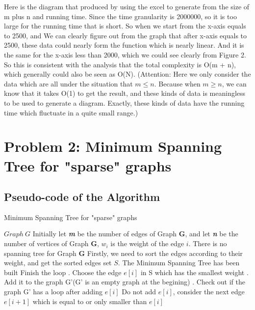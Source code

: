 \documentclass[]{article}
\begin{document}
	\noindent Here is the diagram that produced by using the excel to generate from the size of m plus n and running time. Since the time granularity is 2000000, so it is too large for the running time that is short. So when we start from the x-axis equals to 2500, and We can clearly figure out from the graph that after x-axis equals to 2500, these data could nearly form the function which is nearly linear. And it is the same for the x-axis less than 2000, which we could see clearly from Figure 2. So this is consistent with the analysis that the total complexity is O(m + n), which generally could also be seen as O(N). (Attention: Here we only consider the data which are all under the situation that $m \leq n$. Because when $m \geq n$, we can know that it takes O(1) to get the result, and these kinds of data is meaningless to be used to generate a diagram. Exactly, these kinds of data have the running time which fluctuate in a quite small range.)\\
	
	\clearpage
	
	\section{Problem 2: Minimum Spanning Tree for "sparse" graphs}
	\subsection{Pseudo-code of the Algorithm}
	\begin{algorithm}  
		\caption{Minimum Spanning Tree for "sparse" graphs}  
		\begin{algorithmic} 
			\Require $Graph\ G$  
			\Ensure
			\State Initially let \emph{\textbf{m}} be the number of edges of Graph \textbf{G}, and let \emph{\textbf{n}} be the number of vertices of Graph \textbf{G}, $w_{i}$ is the weight of the edge $i$.
			\State There is no spanning tree for Graph \textbf{G}
			\Else
			\State Firstly, we need to sort the edges according to their weight, and get the sorted edges set $S$.
					\State The Minimum Spanning Tree has been built
					\State Finish the loop
				\Else
				. Choose the edge $e[i]$ in S which has the smallest weight 
				. Add it to the graph G'(G' is an empty graph at the begining)
				. Check out if the graph G' has a loop after adding $e[i]$
					\State Do not add $e[i]$, consider the next edge $e[i+1]$ which is equal to or only smaller than $e[i]$
				\EndIf
				\EndIf
			\EndFor
			\EndIf
		\end{algorithmic}  
	\end{algorithm} 
	
\end{document}
